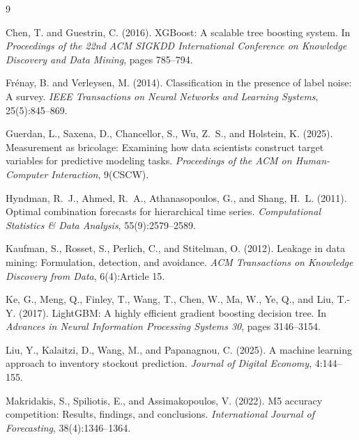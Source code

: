 \documentclass[11pt]{article}
\begin{document}
\begingroup
\small

\begin{thebibliography}{9}

Chen, T. and Guestrin, C. (2016).
\newblock XGBoost: A scalable tree boosting system.
\newblock In \emph{Proceedings of the 22nd ACM SIGKDD International Conference on Knowledge Discovery and Data Mining}, pages 785--794.

Fr\'enay, B. and Verleysen, M. (2014).
\newblock Classification in the presence of label noise: A survey.
\newblock \emph{IEEE Transactions on Neural Networks and Learning Systems}, 25(5):845--869.

Guerdan, L., Saxena, D., Chancellor, S., Wu, Z.~S., and Holstein, K. (2025).
\newblock Measurement as bricolage: Examining how data scientists construct target variables for predictive modeling tasks.
\newblock \emph{Proceedings of the ACM on Human-Computer Interaction}, 9(CSCW).

Hyndman, R.~J., Ahmed, R.~A., Athanasopoulos, G., and Shang, H.~L. (2011).
\newblock Optimal combination forecasts for hierarchical time series.
\newblock \emph{Computational Statistics \& Data Analysis}, 55(9):2579--2589.

Kaufman, S., Rosset, S., Perlich, C., and Stitelman, O. (2012).
\newblock Leakage in data mining: Formulation, detection, and avoidance.
\newblock \emph{ACM Transactions on Knowledge Discovery from Data}, 6(4):Article 15.

Ke, G., Meng, Q., Finley, T., Wang, T., Chen, W., Ma, W., Ye, Q., and Liu, T.-Y. (2017).
\newblock LightGBM: A highly efficient gradient boosting decision tree.
\newblock In \emph{Advances in Neural Information Processing Systems 30}, pages 3146--3154.

Liu, Y., Kalaitzi, D., Wang, M., and Papanagnou, C. (2025).
\newblock A machine learning approach to inventory stockout prediction.
\newblock \emph{Journal of Digital Economy}, 4:144--155.

Makridakis, S., Spiliotis, E., and Assimakopoulos, V. (2022).
\newblock M5 accuracy competition: Results, findings, and conclusions.
\newblock \emph{International Journal of Forecasting}, 38(4):1346--1364.


\end{thebibliography}
\end{document}
